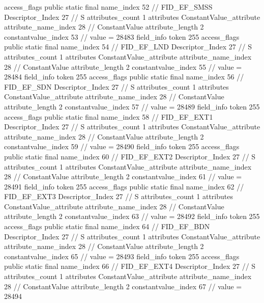 {{{{{				access_flags	public static final
				name_index	52		// FID_EF_SMSS
				Descriptor_Index	27		// S
				attributes_count	1
				attributes {
				ConstantValue_attribute {
					attribute_name_index	28		// ConstantValue
					attribute_length	2
					constantvalue_index	53		// value = 28483
				}
				}
			}
			field_info {
				token	255
				access_flags	public static final
				name_index	54		// FID_EF_LND
				Descriptor_Index	27		// S
				attributes_count	1
				attributes {
				ConstantValue_attribute {
					attribute_name_index	28		// ConstantValue
					attribute_length	2
					constantvalue_index	55		// value = 28484
				}
				}
			}
			field_info {
				token	255
				access_flags	public static final
				name_index	56		// FID_EF_SDN
				Descriptor_Index	27		// S
				attributes_count	1
				attributes {
				ConstantValue_attribute {
					attribute_name_index	28		// ConstantValue
					attribute_length	2
					constantvalue_index	57		// value = 28489
				}
				}
			}
			field_info {
				token	255
				access_flags	public static final
				name_index	58		// FID_EF_EXT1
				Descriptor_Index	27		// S
				attributes_count	1
				attributes {
				ConstantValue_attribute {
					attribute_name_index	28		// ConstantValue
					attribute_length	2
					constantvalue_index	59		// value = 28490
				}
				}
			}
			field_info {
				token	255
				access_flags	public static final
				name_index	60		// FID_EF_EXT2
				Descriptor_Index	27		// S
				attributes_count	1
				attributes {
				ConstantValue_attribute {
					attribute_name_index	28		// ConstantValue
					attribute_length	2
					constantvalue_index	61		// value = 28491
				}
				}
			}
			field_info {
				token	255
				access_flags	public static final
				name_index	62		// FID_EF_EXT3
				Descriptor_Index	27		// S
				attributes_count	1
				attributes {
				ConstantValue_attribute {
					attribute_name_index	28		// ConstantValue
					attribute_length	2
					constantvalue_index	63		// value = 28492
				}
				}
			}
			field_info {
				token	255
				access_flags	public static final
				name_index	64		// FID_EF_BDN
				Descriptor_Index	27		// S
				attributes_count	1
				attributes {
				ConstantValue_attribute {
					attribute_name_index	28		// ConstantValue
					attribute_length	2
					constantvalue_index	65		// value = 28493
				}
				}
			}
			field_info {
				token	255
				access_flags	public static final
				name_index	66		// FID_EF_EXT4
				Descriptor_Index	27		// S
				attributes_count	1
				attributes {
				ConstantValue_attribute {
					attribute_name_index	28		// ConstantValue
					attribute_length	2
					constantvalue_index	67		// value = 28494
}}}}}}}
